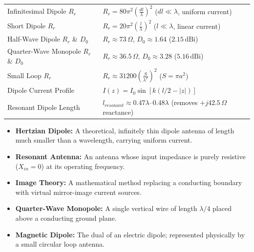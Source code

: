 \documentclass[12pt,a4paper]{article}
\renewcommand{\arraystretch}{1.45}
\begin{document}
\begin{tcolorbox}[formulabox, title={\textbf{Key Formulas and Metrics at a Glance}}]
\renewcommand{\arraystretch}{1.35}
\begin{tabularx}{\linewidth}{B{5.2cm} X}
Infinitesimal Dipole $R_r$ & $R_r = 80\pi^2 \left(\frac{dl}{\lambda}\right)^2$ \quad ($dl \ll \lambda$, uniform current) \\[4pt]
Short Dipole $R_r$ & $R_r = 20\pi^2 \left(\frac{l}{\lambda}\right)^2$ \quad ($l \ll \lambda$, linear current) \\[4pt]
Half-Wave Dipole $R_r$ \& $D_0$ & $R_r \approx 73\,\Omega$, \quad $D_0 \approx 1.64$ ($2.15\,\text{dBi}$) \\[4pt]
Quarter-Wave Monopole $R_r$ \& $D_0$ & $R_r \approx 36.5\,\Omega$, \quad $D_0 \approx 3.28$ ($5.16\,\text{dBi}$) \\[4pt]
Small Loop $R_r$ & $R_r \approx 31200 \left(\frac{S}{\lambda^2}\right)^2$ \quad ($S = \pi a^2$) \\[4pt]
Dipole Current Profile & $I(z) = I_0 \sin\left[k(l/2 - |z|)\right]$ \\[4pt]
Resonant Dipole Length & $l_{resonant} \approx 0.47\lambda$–$0.48\lambda$ \quad (removes $+j42.5\,\Omega$ reactance) \\
\end{tabularx}
\end{tcolorbox}

\begin{tcolorbox}[defbox, title={\textbf{One-Line Definitions}}]
\begin{itemize}[leftmargin=*, itemsep=2pt, topsep=0pt]
  \item \textbf{Hertzian Dipole:} A theoretical, infinitely thin dipole antenna of length much smaller than a wavelength, carrying uniform current.
  \item \textbf{Resonant Antenna:} An antenna whose input impedance is purely resistive ($X_{in} = 0$) at its operating frequency.
  \item \textbf{Image Theory:} A mathematical method replacing a conducting boundary with virtual mirror-image current sources.
  \item \textbf{Quarter-Wave Monopole:} A single vertical wire of length $\lambda/4$ placed above a conducting ground plane.
  \item \textbf{Magnetic Dipole:} The dual of an electric dipole; represented physically by a small circular loop antenna.
\end{itemize}
\end{tcolorbox}
\end{document}
